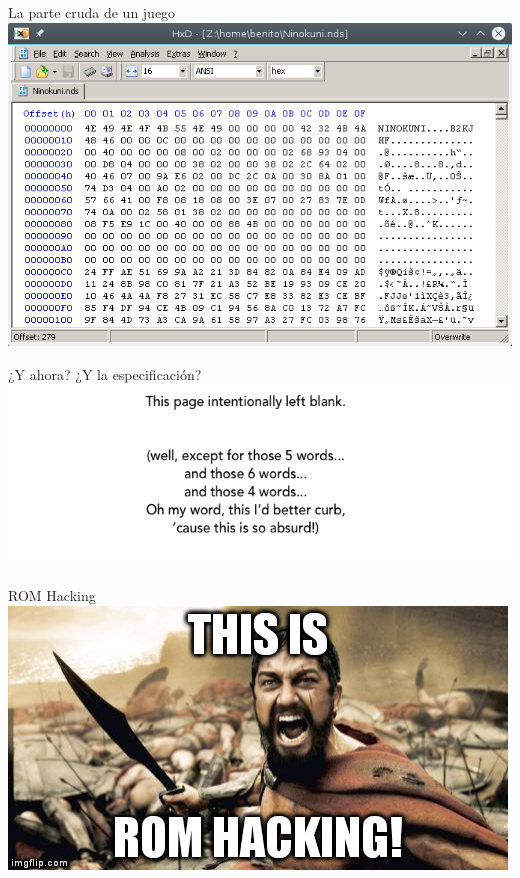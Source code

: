 \begin{frame}{La parte cruda de un juego}
    \includegraphics[width=\textwidth]{imgs/game_hex.png}
\end{frame}

\begin{frame}{¿Y ahora? ¿Y la especificación?}
    \includegraphics[width=\textwidth]{imgs/left_blank.png}
\end{frame}

\begin{frame}{ROM Hacking}
    \includegraphics[width=\textwidth]{imgs/this_is_romhacking.png}
\end{frame}

